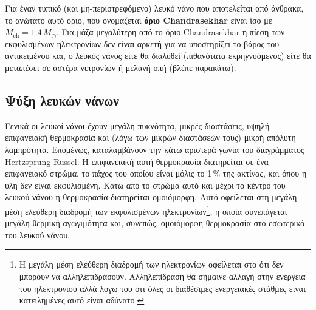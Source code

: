 Για έναν τυπικό (και μη-περιστρεφόμενο) λευκό νάνο που αποτελείται από άνθρακα, το ανώτατο αυτό όριο, που ονομάζεται \textbf{όριο Chandrasekhar} είναι ίσο με $M_{\text{ch}} = 1.4\,M_\odot$.  Για μάζα μεγαλύτερη από το όριο Chandrasekhar η πίεση των εκφυλισμένων ηλεκτρονίων δεν είναι αρκετή για να υποστηρίξει το βάρος του αντικειμένου και, ο λευκός νάνος είτε θα διαλυθεί (πιθανότατα εκρηγνυόμενος) είτε θα μεταπέσει σε αστέρα νετρονίων ή μελανή οπή (βλέπε παρακάτω).

\subsection{Ψύξη λευκών νάνων}
Γενικά οι λευκοί νάνοι έχουν μεγάλη πυκνότητα, μικρές διαστάσεις, υψηλή επιφανειακή θερμοκρασία και (λόγω των μικρών διαστάσεών τους) μικρή απόλυτη λαμπρότητα. Επομένως, καταλαμβάνουν την κάτω αριστερά γωνία του διαγράμματος Hertzsprung-Russel. Η επιφανειακή αυτή θερμοκρασία διατηρείται σε ένα επιφανειακό στρώμα, το πάχος του οποίου είναι μόλις το 1\,\% της ακτίνας, και όπου η ύλη δεν είναι εκφυλισμένη. Κάτω από το στρώμα αυτό και μέχρι το κέντρο του λευκού νάνου η θερμοκρασία διατηρείται ομοιόμορφη. Αυτό οφείλεται στη μεγάλη μέση ελεύθερη διαδρομή των εκφυλισμένων ηλεκτρονίων\footnote{Η μεγάλη μέση ελεύθερη διαδρομή των ηλεκτρονίων οφείλεται στο ότι δεν μπορουν να αλληλεπιδράσουν. Αλληλεπίδραση θα σήμαινε αλλαγή στην ενέργεια του ηλεκτρονίου αλλά λόγω του ότι όλες οι διαθέσιμες ενεργειακές στάθμες είναι κατειλημένες αυτό είναι αδύνατο.}, η οποία συνεπάγεται μεγάλη θερμική αγωγιμότητα και, συνεπώς, ομοιόμορφη θερμοκρασία στο εσωτερικό του λευκού νάνου.

